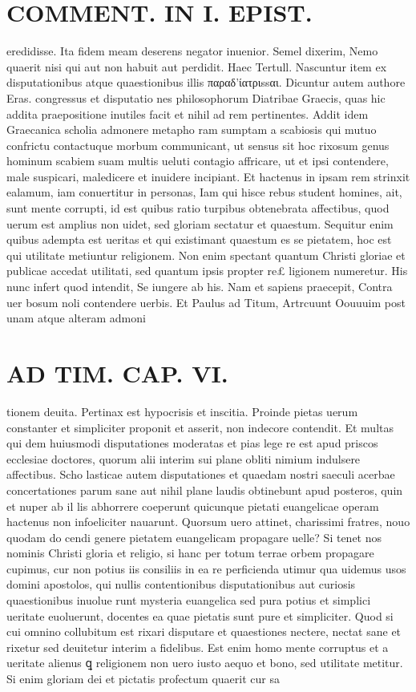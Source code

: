 \documentclass{article}
\begin{document}
\begin{pages}
\section*{COMMENT. IN I. EPIST. }\pstart eredidisse. Ita fidem meam deserens negator inuenior. Semel dixerim, Nemo quaerit nisi qui aut non habuit aut perdidit. Haec Tertull. Nascuntur item ex disputationibus atque quaestionibus illis παραδ'ίατριssαι. Dicuntur autem authore Eras. congressus et disputatio nes philosophorum Diatribae Graecis, quas hic addita praepositione inutiles facit et nihil ad rem pertinentes. Addit idem Graecanica scholia admonere metapho ram sumptam a scabiosis qui mutuo confrictu contactuque morbum communicant, ut sensus sit hoc rixosum genus hominum scabiem suam multis ueluti contagio affricare, ut et ipsi contendere, male suspicari, maledicere et inuidere incipiant. Et hactenus in ipsam rem strinxit ealamum, iam conuertitur in personas, Iam qui hisce rebus student homines, ait, sunt mente corrupti, id est quibus ratio turpibus obtenebrata affectibus, quod uerum est amplius non uidet, sed gloriam sectatur et quaestum. Sequitur enim quibus adempta est ueritas et qui existimant quaestum es se pietatem, hoc est qui utilitate metiuntur religionem. Non enim spectant quantum Christi gloriae et publicae accedat utilitati, sed quantum ipsis propter re£ ligionem numeretur. His nunc infert quod intendit, Se iungere ab his. Nam et sapiens praecepit, Contra uer bosum noli contendere uerbis. Et Paulus ad Titum, Artrcuunt Oouuuim post unam atque alteram admoni  \pend
\section*{AD TIM. CAP. VI. }
\marginpar{[ p.167 ]}\pstart tionem deuita. Pertinax est hypocrisis et inscitia. Proinde pietas uerum constanter et simpliciter proponit et asserit, non indecore contendit. Et multas qui dem huiusmodi disputationes moderatas et pias lege re est apud priscos ecclesiae doctores, quorum alii interim sui plane obliti nimium indulsere affectibus. Scho lasticae autem disputationes et quaedam nostri saeculi acerbae concertationes parum sane aut nihil plane laudis obtinebunt apud posteros, quin et nuper ab il lis abhorrere coeperunt quicunque pietati euangelicae operam hactenus non infoeliciter nauarunt. Quorsum uero attinet, charissimi fratres, nouo quodam do cendi genere pietatem euangelicam propagare uelle? Si tenet nos nominis Christi gloria et religio, si hanc per totum terrae orbem propagare cupimus, cur non potius iis consiliis in ea re perficienda utimur qua uidemus usos domini apostolos, qui nullis contentionibus disputationibus aut curiosis quaestionibus inuolue runt mysteria euangelica sed pura potius et simplici ueritate euoluerunt, docentes ea quae pietatis sunt pure et simpliciter. Quod si cui omnino collubitum est rixari disputare et quaestiones nectere, nectat sane et rixetur sed deuitetur interim a fidelibus. Est enim homo mente corruptus et a ueritate alienus ꝗ religionem non uero iusto aequo et bono, sed utilitate metitur. Si enim gloriam dei et pictatis profectum quaerit cur sa  \pend

\end{pages}
\end{document}
